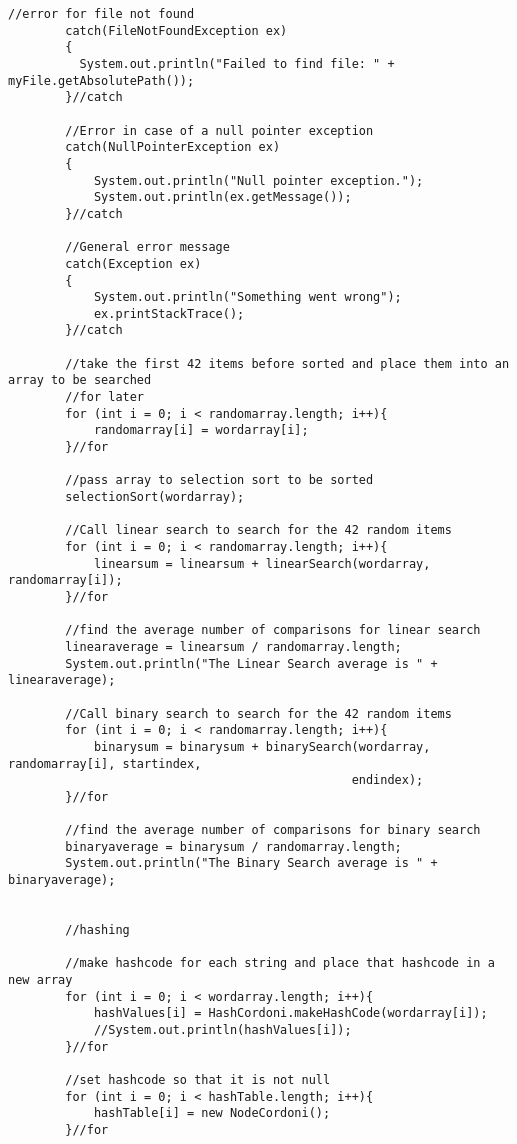 \documentclass[letterpaper, 10pt,DIV=13]{scrartcl}
\numberwithin{equation}{section} %
\numberwithin{figure}{section} %
\numberwithin{table}{section} %
\begin{document}
\begin{lstlisting}[frame=single, ]
        //error for file not found
        catch(FileNotFoundException ex)
        {
          System.out.println("Failed to find file: " + myFile.getAbsolutePath()); 
        }//catch

        //Error in case of a null pointer exception
        catch(NullPointerException ex)
        {
            System.out.println("Null pointer exception.");
            System.out.println(ex.getMessage());
        }//catch

        //General error message
        catch(Exception ex)
        {
            System.out.println("Something went wrong");
            ex.printStackTrace();
        }//catch

        //take the first 42 items before sorted and place them into an array to be searched 
        //for later
        for (int i = 0; i < randomarray.length; i++){
            randomarray[i] = wordarray[i];
        }//for

        //pass array to selection sort to be sorted
        selectionSort(wordarray);

        //Call linear search to search for the 42 random items
        for (int i = 0; i < randomarray.length; i++){
            linearsum = linearsum + linearSearch(wordarray, randomarray[i]);
        }//for

        //find the average number of comparisons for linear search
        linearaverage = linearsum / randomarray.length;
        System.out.println("The Linear Search average is " + linearaverage);

        //Call binary search to search for the 42 random items
        for (int i = 0; i < randomarray.length; i++){
            binarysum = binarysum + binarySearch(wordarray, randomarray[i], startindex, 
                                                endindex);
        }//for

        //find the average number of comparisons for binary search
        binaryaverage = binarysum / randomarray.length;
        System.out.println("The Binary Search average is " + binaryaverage);


        //hashing

        //make hashcode for each string and place that hashcode in a new array
        for (int i = 0; i < wordarray.length; i++){
            hashValues[i] = HashCordoni.makeHashCode(wordarray[i]);
            //System.out.println(hashValues[i]);
        }//for

        //set hashcode so that it is not null
        for (int i = 0; i < hashTable.length; i++){
            hashTable[i] = new NodeCordoni();
        }//for



\end{lstlisting}
\end{document}
